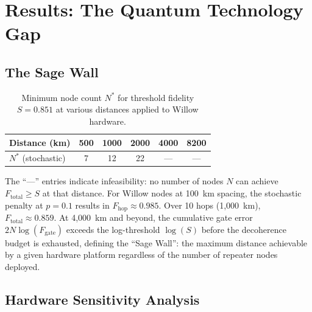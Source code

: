 \documentclass[aps,pra,reprint,amsmath,amssymb,superscriptaddress]{revtex4-2}
\begin{document}

\section{Results: The Quantum Technology Gap}

\subsection{The Sage Wall}

\begin{table}[h]
\caption{Minimum node count $N^*$ for threshold fidelity $S = 0.851$ at various distances applied to Willow hardware.}
\label{tab:optimal}
\begin{ruledtabular}
\begin{tabular}{lccccc}
Distance (km) & 500 & 1000 & 2000 & 4000 & 8200 \\
\hline
$N^*$ (stochastic) & 7 & 12 & 22 & --- & --- \\
\end{tabular}
\end{ruledtabular}
\end{table}

The ``---'' entries indicate infeasibility: no number of nodes $N$ can achieve $F_{\text{total}} \geq S$ at that distance. For Willow nodes at 100~km spacing, the stochastic penalty at $p=0.1$ results in $F_{\text{hop}} \approx 0.985$. Over 10 hops (1,000~km), $F_{\text{total}} \approx 0.859$. At 4,000~km and beyond, the cumulative gate error $2N\log(F_{\text{gate}})$ exceeds the log-threshold $\log(S)$ before the decoherence budget is exhausted, defining the ``Sage Wall'': the maximum distance achievable by a given hardware platform regardless of the number of repeater nodes deployed.

\subsection{Hardware Sensitivity Analysis}
\end{document}
